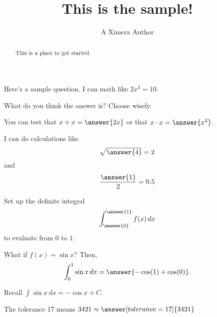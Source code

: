 \documentclass{ximera}
\title{This is the sample!}
\author{A Ximera Author}
\begin{document}
\begin{abstract}
  This is a place to get started.
\end{abstract}
\maketitle

Here's a sample question.  I can math like $2x^3 = 10$. 

\begin{problem}
  What do you think the answer is? Choose wisely.

  \begin{multipleChoice}
  \end{multipleChoice}
\end{problem}

\begin{problem}
  \begin{multipleChoice}
  \end{multipleChoice}
\end{problem}

\begin{problem}
  You can test that $x + x = \answer{2x}$
  or that $x \cdot x = \answer{x^2}$.

  I can do calculations like 
  \[
    \sqrt{\answer{4}} = 2
  \]
  and
  \[
    \frac{\answer{1}}{2} = 0.5
  \]
\end{problem}

\begin{problem}
  Set up the definite integral
    \[
      \int_{\answer{0}}^{\answer{1}} f(x) \, dx
    \]
  to evaluate from $0$ to $1$.

  \begin{question}
    What if $f(x) = \sin x$?  Then,
    \[
       \int_0^1 \sin x \, dx = \answer{-\cos(1) + \cos(0)}.
    \]

    \begin{hint}
      Recall $\int \sin x \, dx = -\cos x + C$.
    \end{hint}
  \end{question}
\end{problem}

\begin{problem}
   The tolerance 17 means $3421 \approx \answer[tolerance=17]{3421}$
\end{problem}
\end{document}
